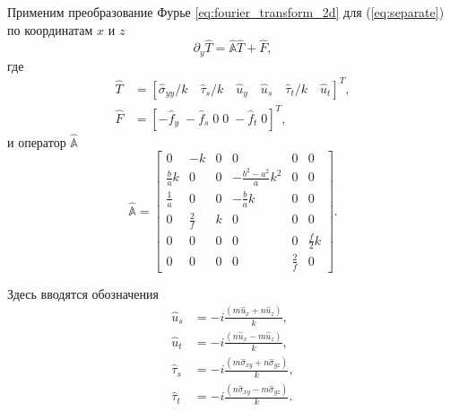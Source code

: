 Применим преобразование Фурье \eqref{eq:fourier_transform_2d} для (\ref{eq:separate}) по координатам $x$ и $z$
\begin{equation}
    \label{eq:FT_system}
    \partial_y \hat{T} = \hat{\mathbb{A}} \hat{T} + \hat{F},
\end{equation}
где
\begin{equation}
    \label{eq:FourierT}
    \begin{split}
        \hat{T} &= \left[\hat{\sigma}_{yy}/k \quad \hat{\tau}_s/k \quad \hat{u}_y \quad \hat{u}_s \quad  \hat{\tau}_t/k \quad  \hat{u}_t \right]^T, \\
        \hat{F} &= \left[-\hat{f}_y \; -\hat{f}_s \; 0 \; 0 \; -\hat{f}_t \; 0\right]^T,
    \end{split}
\end{equation}
и оператор $\hat{\mathbb{A}}$
\begin{equation}
    \label{eq:FourierA}
    \hat{\mathbb{A}} = 
    \left[\begin{array}{cccccc}
        0 & -k & 0 & 0 & 0 & 0 \\
        \frac{b}{a}k & 0 & 0 & -\frac{b^2-a^2}{a}k^2 & 0 & 0 \\
        \frac{1}{a} & 0 & 0 & -\frac{b}{a}k & 0 & 0 \\
        0 & \frac{2}{f} & k & 0 & 0 & 0 \\
        0 & 0 & 0 & 0 & 0 & \frac{f}{2}k \\
        0 & 0 & 0 & 0 & \frac{2}{f} & 0 
    \end{array}\right].
\end{equation}

Здесь вводятся обозначения
\begin{equation}
    \label{eq:FT_special_variables}
    \begin{split}
        \hat{u}_s & = -i \frac{(m\hat{u}_x + n\hat{u}_z)}{k}, \\
        \hat{u}_t & = -i \frac{(n\hat{u}_x - m\hat{u}_z)}{k}, \\
        \hat{\tau}_s & = -i \frac{(m\hat{\sigma}_{xy} + n\hat{\sigma}_{yz})}{k}, \\
        \hat{\tau}_t & = -i \frac{(n\hat{\sigma}_{xy} - m\hat{\sigma}_{yz})}{k}. \\
    \end{split} 
\end{equation}

